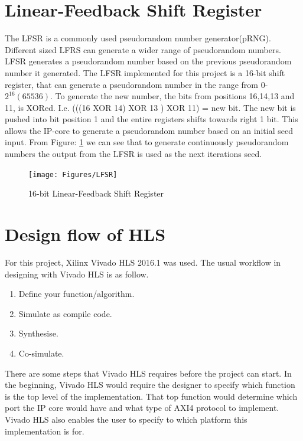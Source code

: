 \section{Linear-Feedback Shift Register}
The LFSR is a commonly used pseudorandom number generator(pRNG)\citep{murase1992linear}. Different sized LFRS can generate a wider range of pseudorandom numbers. LFSR generates a pseudorandom number based on the previous pseudorandom number it generated. The LFSR implemented for this project is a 16-bit shift register, that can generate a pseudorandom number in the range from 0-$2^{16}(65536)$. To generate the new number, the bits from positions 16,14,13 and 11, is XORed. I.e. (((16 XOR 14) XOR 13 ) XOR 11) = new bit. The new bit is pushed into bit position 1 and the entire registers shifts towards right 1 bit. 
This allows the IP-core to generate a pseudorandom number based on an initial seed input. From Figure: \ref{fig:LFSR} we can see that to generate continuously pseudorandom numbers the output from the LFSR is used as the next iterations seed. 

\begin{figure}[!ht]
\texttt{[image: Figures/LFSR]}
\caption{16-bit Linear-Feedback Shift Register}
    \label{fig:LFSR}
\end{figure}




\section{Design flow of HLS}

For this project, Xilinx Vivado HLS 2016.1 was used. The usual workflow in designing with Vivado HLS is as follow. 

\begin{enumerate}
\item Define your function/algorithm.
\item Simulate as compile code. 
\item Synthesise.
\item Co-simulate.
\end{enumerate}


There are some steps that Vivado HLS requires before the project can start. In the beginning, Vivado HLS would require the designer to specify which function is the top level of the implementation. That top function would determine which port the IP core would have and what type of AXI4 protocol to implement. Vivado HLS also enables the user to specify to which platform this implementation is for.


